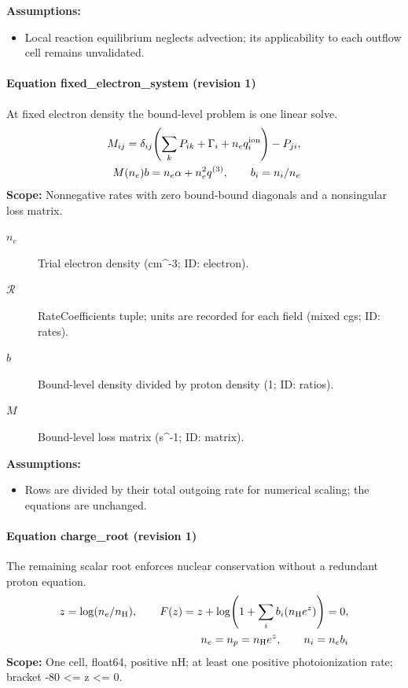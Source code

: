 \noindent\textbf{Assumptions:}
\begin{itemize}
\item Local reaction equilibrium neglects advection; its applicability to each outflow cell remains unvalidated.
\end{itemize}

\paragraph{Equation fixed\_electron\_system (revision 1)}
At fixed electron density the bound-level problem is one linear solve.
\begin{equation}
\begin{aligned}
M_{ij}=\delta_{ij}\!\left(\sum_kP_{ik}+\Gamma_i+n_eq_i^{\rm ion}\right)-P_{ji},\\M(n_e)b=n_e\alpha+n_e^2q^{(3)},\qquad b_i=n_i/n_e
\end{aligned}
\label{eq:escape.hydrogen_5f_nlte:fixed_5f_electron_5f_system:1}
\end{equation}
\noindent\textbf{Scope:} Nonnegative rates with zero bound-bound diagonals and a nonsingular loss matrix.

\begin{description}
\item[$n_e$] Trial electron density (cm\textasciicircum{}-3; ID: electron).
\item[$\mathcal R$] RateCoefficients tuple; units are recorded for each field (mixed cgs; ID: rates).
\item[$b$] Bound-level density divided by proton density (1; ID: ratios).
\item[$M$] Bound-level loss matrix (s\textasciicircum{}-1; ID: matrix).
\end{description}

\noindent\textbf{Assumptions:}
\begin{itemize}
\item Rows are divided by their total outgoing rate for numerical scaling; the equations are unchanged.
\end{itemize}

\paragraph{Equation charge\_root (revision 1)}
The remaining scalar root enforces nuclear conservation without a redundant proton equation.
\begin{equation}
\begin{aligned}
z=\log(n_e/n_{\rm H}),\qquad F(z)=z+\log\!\left(1+\sum_i b_i(n_{\rm H}e^z)\right)=0,\\n_e=n_p=n_{\rm H}e^z,\qquad n_i=n_e b_i
\end{aligned}
\label{eq:escape.hydrogen_5f_nlte:charge_5f_root:1}
\end{equation}
\noindent\textbf{Scope:} One cell, float64, positive nH; at least one positive photoionization rate; bracket -80 <= z <= 0.

